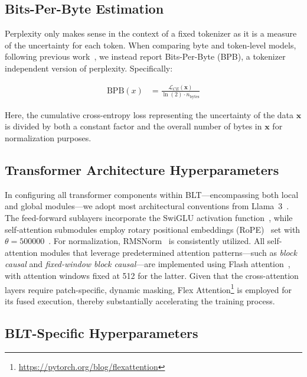 \subsection{Bits-Per-Byte Estimation} Perplexity only makes sense in the context of a fixed tokenizer as it is a measure of the uncertainty for each token. When comparing byte and token-level models, following previous work~\citep{xue2022byt5, yu2023megabyte, wang2024mambabyte}, we instead report Bits-Per-Byte (BPB), a tokenizer independent version of perplexity. Specifically:

\begin{align}
    \text{BPB}(x)&= \frac{\mathcal{L}_{CE}(\pmb{x})}{\ln(2)\cdot n_{\text{bytes}}}
\end{align}

Here, the cumulative cross-entropy loss representing the uncertainty of the data $\pmb{x}$ is divided by both a constant factor and the overall number of bytes in $\pmb{x}$ for normalization purposes.

\subsection{Transformer Architecture Hyperparameters} In configuring all transformer components within {\textsc BLT}—encompassing both local and global modules—we adopt most architectural conventions from Llama~3~\citep{dubey2024llama}. The feed-forward sublayers incorporate the SwiGLU activation function~\citep{swiglu}, while self-attention submodules employ rotary positional embeddings (RoPE)~\citep{RoPe} set with $\theta=500000$~\citep{xiong2024effective}. For normalization, RMSNorm~\citep{RMSNorm} is consistently utilized. All self-attention modules that leverage predetermined attention patterns—such as \textit{block causal} and \textit{fixed-window block causal}—are implemented using Flash attention~\citep{dao2022flashattention}, with attention windows fixed at 512 for the latter. Given that the cross-attention layers require patch-specific, dynamic masking, Flex Attention\footnote{\url{https://pytorch.org/blog/flexattention}} is employed for its fused execution, thereby substantially accelerating the training process.

\subsection{{\textsc BLT}-Specific Hyperparameters}

